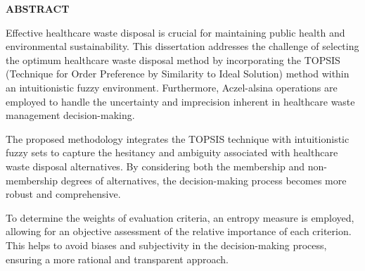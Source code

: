 \begin{center}
  {\LARGE{\bf{ABSTRACT}}}
\end{center}

\vspace{2em}




\vspace{2em}


\hspace{1cm}Effective healthcare waste disposal is crucial for maintaining public health and environmental sustainability. This dissertation addresses the challenge of selecting the optimum healthcare waste disposal method by incorporating the TOPSIS (Technique for Order Preference by Similarity to Ideal Solution) method within an intuitionistic fuzzy environment. Furthermore, Aczel-alsina operations are employed to handle the uncertainty and imprecision inherent in healthcare waste management decision-making.

\hspace{1.5cm}The proposed methodology integrates the TOPSIS technique with intuitionistic fuzzy sets to capture the hesitancy and ambiguity associated with healthcare waste disposal alternatives. By considering both the membership and non-membership degrees of alternatives, the decision-making process becomes more robust and comprehensive.

\hspace{1.5cm}To determine the weights of evaluation criteria, an entropy measure is employed, allowing for an objective assessment of the relative importance of each criterion. This helps to avoid biases and subjectivity in the decision-making process, ensuring a more rational and transparent approach.

